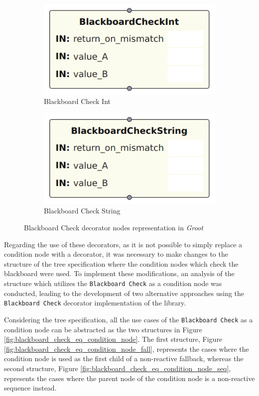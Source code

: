 \begin{figure}[!h]
    \centering
    \begin{subfigure}[b]{.49\linewidth}
        \centering
        \includegraphics[width=0.65\linewidth]{chapters/development/images/BlackboardCheckIntNode.png}
        \caption{Blackboard Check Int}
        \label{fig:blackboard_check_int_impl}
    \end{subfigure}
    \hfill
    \begin{subfigure}[b]{.49\linewidth}
        \centering
        \includegraphics[width=0.65\linewidth]{chapters/development/images/BlackboardCheckStringNode.png}
        \caption{Blackboard Check String}
        \label{fig:blackboard_check_string_impl}
    \end{subfigure}
    \caption{Blackboard Check decorator nodes representation in \textit{Groot}}
    \label{fig:common_decorator_nodes_impl}
\end{figure}

Regarding the use of these decorators, as it is not possible to simply replace a condition node with a decorator, it was necessary to make changes to the structure of the tree specification where the condition nodes which check the blackboard were used. To implement these modifications, an analysis of the structure which utilizes the \texttt{Blackboard Check} as a condition node was conducted, leading to the development of two alternative approaches using the \texttt{Blackboard Check} decorator implementation of the library.

Considering the tree specification, all the use cases of the \texttt{Blackboard Check} as a condition node can be abstracted as the two structures in Figure \ref{fig:blackboard_check_eq_condition_node}. The first structure, Figure \ref{fig:blackboard_check_eq_condition_node_fall}, represents the cases where the condition node is used as the first child of a non-reactive fallback, whereas the second structure, Figure \ref{fig:blackboard_check_eq_condition_node_seq}, represents the cases where the parent node of the condition node is a non-reactive sequence instead.

